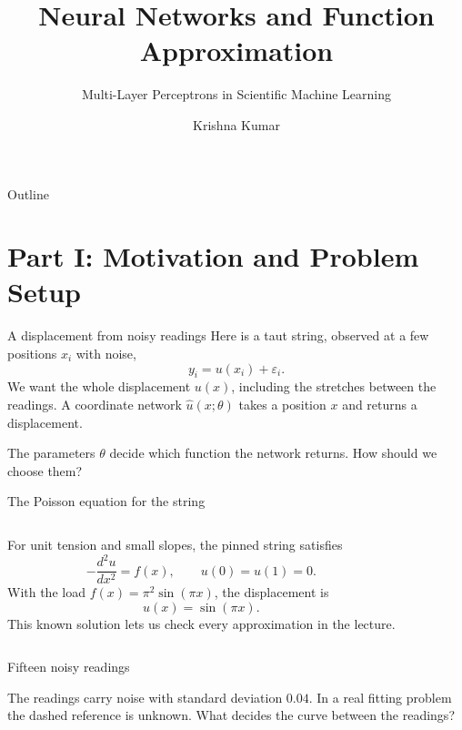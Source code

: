 \documentclass[aspectratio=169]{beamer}
\title[Neural Networks \& Function Approximation]{Neural Networks and Function Approximation}
\subtitle{Multi-Layer Perceptrons in Scientific Machine Learning}
\author{Krishna Kumar}
\institute[UT Austin]{
	University of Texas at Austin \\
	\medskip
	\textit{\url{krishnak@utexas.edu}}
}
\date{}
\begin{document}
\begin{frame}
\titlepage
\end{frame}

\begin{frame}{Outline}
\tableofcontents
\end{frame}

\section{Part I: Motivation and Problem Setup}

\begin{frame}{A displacement from noisy readings}
Here is a taut string, observed at a few positions $x_i$ with noise,
\[
y_i=u(x_i)+\varepsilon_i .
\]
We want the whole displacement $u(x)$, including the stretches between the readings.
A coordinate network $\hat u(x;\theta)$ takes a position $x$ and returns a displacement.
\bigskip

The parameters $\theta$ decide which function the network returns.
How should we choose them?
\end{frame}

\begin{frame}{The Poisson equation for the string}
\begin{columns}[T]
For unit tension and small slopes, the pinned string satisfies
\[
-\frac{d^2u}{dx^2}=f(x),\qquad u(0)=u(1)=0.
\]
With the load $f(x)=\pi^2\sin(\pi x)$, the displacement is
\[
u(x)=\sin(\pi x).
\]
This known solution lets us check every approximation in the lecture.
\end{columns}
\end{frame}

\begin{frame}{Fifteen noisy readings}
\begin{center}
\end{center}
The readings carry noise with standard deviation $0.04$.
In a real fitting problem the dashed reference is unknown.
What decides the curve between the readings?
\end{frame}
\end{document}
